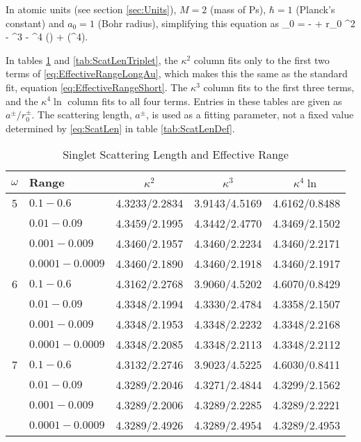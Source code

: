 \documentclass[Dissertation.tex]{subfiles}
\begin{document}
\noindent In atomic units (see section \ref{sec:Units}), $M = 2$ (mass of Ps), $\hbar = 1$ (Planck's constant) and $a_0 = 1$ (Bohr radius), simplifying this equation as
\beq
\label{eq:EffectiveRangeLongAu}
\kappa \cot\eta_0 = - +  r_0 \kappa^2 -  \kappa^3 -  \kappa^4 \ln \left(\kappa \right) + (\kappa^4).
\eeq

In tables \ref{tab:ScatLenSinglet} and \ref{tab:ScatLenTriplet}, the $\kappa^2$ column fits only to the first two terms of \ref{eq:EffectiveRangeLongAu}, which makes this the same as the standard fit, equation \ref{eq:EffectiveRangeShort}.  The $\kappa^3$ column fits to the first three terms, and the $\kappa^4 \ln$ column fits to all four terms.  Entries in these tables are given as $a^\pm / r_0^\pm$. The scattering length, $a^\pm$, is used as a fitting parameter, not a fixed value determined by \ref{eq:ScatLen} in table \ref{tab:ScatLenDef}.


\begin{table}[H]
\begin{center}
\begin{tabular}{c l c c c}
\toprule
$\omega$ & Range & $\kappa^2$ & $\kappa^3$ & $\kappa^4 \ln$ \\
\midrule
5 & $0.1 - 0.6$ & 4.3233/2.2834 & 3.9143/4.5169 & 4.6162/0.8488 \\
  & $0.01 - 0.09$ & 4.3459/2.1995 & 4.3442/2.4770 & 4.3469/2.1502 \\
  & $0.001 - 0.009$ & 4.3460/2.1957 & 4.3460/2.2234 & 4.3460/2.2171 \\
  & $0.0001 - 0.0009$ & 4.3460/2.1890 & 4.3460/2.1918 & 4.3460/2.1917 \\
\midrule
6 & $0.1 - 0.6$ & 4.3162/2.2768 & 3.9060/4.5202 & 4.6070/0.8429 \\
  & $0.01 - 0.09$ & 4.3348/2.1994 & 4.3330/2.4784 & 4.3358/2.1507 \\
  & $0.001 - 0.009$ & 4.3348/2.1953 & 4.3348/2.2232 & 4.3348/2.2168 \\
  & $0.0001 - 0.0009$ & 4.3348/2.2085 & 4.3348/2.2113 & 4.3348/2.2112 \\
\midrule
7 & $0.1 - 0.6$ & 4.3132/2.2746 & 3.9023/4.5225 & 4.6030/0.8411 \\
  & $0.01 - 0.09$ & 4.3289/2.2046 & 4.3271/2.4844 & 4.3299/2.1562 \\
  & $0.001 - 0.009$ & 4.3289/2.2006 & 4.3289/2.2285 & 4.3289/2.2221 \\
  & $0.0001 - 0.0009$ & 4.3289/2.4926 & 4.3289/2.4954 & 4.3289/2.4953 \\
\bottomrule
\end{tabular}
\caption{Singlet Scattering Length and Effective Range}
\label{tab:ScatLenSinglet}
\end{center}
\end{table}
\end{document}
